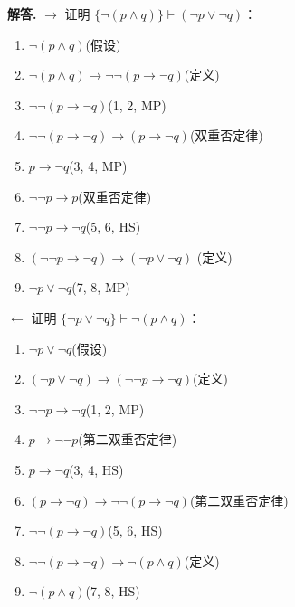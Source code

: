 \documentclass[12pt, a4paper, oneside]{ctexart}
\newenvironment{solution}{\par\noindent\textbf{解答. }}{\par}
\begin{document}
\begin{solution}
    $\to$ 证明 $\{\lnot(p\land q)\} \vdash (\lnot p \lor \lnot q)$：
    \begin{enumerate}
        \item [(1)] $\lnot(p\land q)$\hfill (假设)
        \item [(2)] $\lnot(p \land q) \to \lnot\lnot(p \to \lnot q)$\hfill (定义)
        \item [(3)] $\lnot\lnot(p \to \lnot q)$\hfill (1, 2, MP)
        \item [(4)] $\lnot\lnot(p \to \lnot q) \to (p \to \lnot q)$\hfill (双重否定律)
        \item [(5)] $p \to \lnot q$\hfill (3, 4, MP)
        \item [(6)] $\lnot\lnot p \to p$\hfill (双重否定律)
        \item [(7)] $\lnot\lnot p \to \lnot q$\hfill (5, 6, HS)
        \item [(8)] $(\lnot\lnot p \to \lnot q) \to (\lnot p \lor \lnot q)$ \hfill (定义)
        \item [(9)] $\lnot p \lor \lnot q$\hfill (7, 8, MP)
    \end{enumerate}

    $\leftarrow$ 证明 $\{\lnot p \lor \lnot q\} \vdash \lnot(p \land q)$：
    \begin{enumerate}
        \item [(1)] $\lnot p \lor \lnot q$\hfill (假设)
        \item [(2)] $(\lnot p \lor \lnot q) \to (\lnot\lnot p \to \lnot q)$\hfill (定义)
        \item [(3)] $\lnot\lnot p \to \lnot q$\hfill (1, 2, MP)
        \item [(4)] $p \to \lnot\lnot p$\hfill (第二双重否定律)
        \item [(5)] $p \to \lnot q$\hfill (3, 4, HS)
        \item [(6)] $(p \to \lnot q) \to \lnot\lnot (p \to \lnot q)$\hfill (第二双重否定律)
        \item [(7)] $\lnot\lnot(p \to \lnot q)$\hfill (5, 6, HS)
        \item [(8)] $\lnot\lnot(p \to \lnot q) \to \lnot(p \land q)$\hfill (定义)
        \item [(9)] $\lnot(p \land q)$\hfill (7, 8, HS)
    \end{enumerate}
\end{solution}
\end{document}
